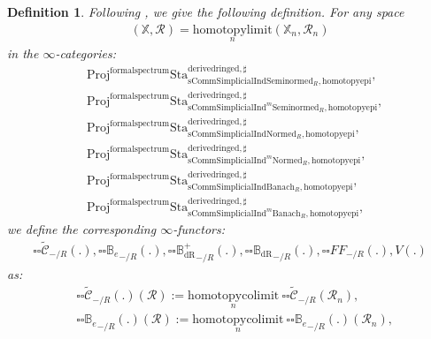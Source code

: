 \documentclass[12pt]{book}
\newtheorem{definition}{Definition}
\begin{document}
\begin{definition}
Following \cite[Definition 9.3.3, Definition 9.3.5, Definition 9.3.11, Definition 9.3.9]{KL1}, \cite{KL2} we give the following definition. For any space
\begin{align}
(\mathbb{X},\mathcal{R})=\underset{n}{\mathrm{homotopylimit}}(\mathbb{X}_n,\mathcal{R}_n)	
\end{align}
in the $\infty$-categories:
\begin{align}
&\mathrm{Proj}^\mathrm{formalspectrum}\mathrm{Sta}^\mathrm{derivedringed,\sharp}_{\mathrm{sComm}\mathrm{Simplicial}\mathrm{Ind}\mathrm{Seminormed}_R,\mathrm{homotopyepi}},\\
&\mathrm{Proj}^\mathrm{formalspectrum}\mathrm{Sta}^\mathrm{derivedringed,\sharp}_{\mathrm{sComm}\mathrm{Simplicial}\mathrm{Ind}^m\mathrm{Seminormed}_R,\mathrm{homotopyepi}},\\
&\mathrm{Proj}^\mathrm{formalspectrum}\mathrm{Sta}^\mathrm{derivedringed,\sharp}_{\mathrm{sComm}\mathrm{Simplicial}\mathrm{Ind}\mathrm{Normed}_R,\mathrm{homotopyepi}},\\
&\mathrm{Proj}^\mathrm{formalspectrum}\mathrm{Sta}^\mathrm{derivedringed,\sharp}_{\mathrm{sComm}\mathrm{Simplicial}\mathrm{Ind}^m\mathrm{Normed}_R,\mathrm{homotopyepi}},\\
&\mathrm{Proj}^\mathrm{formalspectrum}\mathrm{Sta}^\mathrm{derivedringed,\sharp}_{\mathrm{sComm}\mathrm{Simplicial}\mathrm{Ind}\mathrm{Banach}_R,\mathrm{homotopyepi}},\\
&\mathrm{Proj}^\mathrm{formalspectrum}\mathrm{Sta}^\mathrm{derivedringed,\sharp}_{\mathrm{sComm}\mathrm{Simplicial}\mathrm{Ind}^m\mathrm{Banach}_R,\mathrm{homotopyepi}},	
\end{align}
we define the corresponding $\infty$-functors:
\begin{align}
{\square\square}\widetilde{\mathcal{C}}_{-/R}(.),{\square\square}{\mathbb{B}_e}_{-/R}(.),{\square\square}{\mathbb{B}_\mathrm{dR}^+}_{-/R}(.),{\square\square}{\mathbb{B}_\mathrm{dR}}_{-/R}(.),{\square\square}{FF}_{-/R}(.),V(.)	
\end{align}
as:
\begin{align}
&{\square\square}\widetilde{\mathcal{C}}_{-/R}(.)(\mathcal{R}):=\underset{n}{\mathrm{homotopycolimit}}~{\square\square}\widetilde{\mathcal{C}}_{-/R}(\mathcal{R}_n),\\
&{\square\square}{\mathbb{B}_e}_{-/R}(.)(\mathcal{R}):=\underset{n}{\mathrm{homotopycolimit}}~{\square\square}{\mathbb{B}_e}_{-/R}(.)(\mathcal{R}_n),\\

\end{align}
\end{definition}
\end{document}
